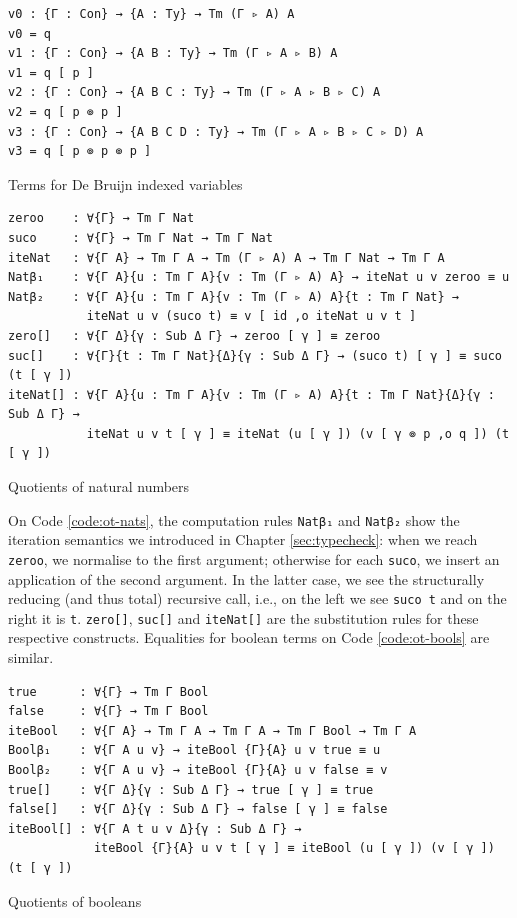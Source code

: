 \begin{listing}[H]
\begin{verbatim}
v0 : {Γ : Con} → {A : Ty} → Tm (Γ ▹ A) A
v0 = q
v1 : {Γ : Con} → {A B : Ty} → Tm (Γ ▹ A ▹ B) A
v1 = q [ p ]
v2 : {Γ : Con} → {A B C : Ty} → Tm (Γ ▹ A ▹ B ▹ C) A
v2 = q [ p ⊚ p ]
v3 : {Γ : Con} → {A B C D : Ty} → Tm (Γ ▹ A ▹ B ▹ C ▹ D) A
v3 = q [ p ⊚ p ⊚ p ]
\end{verbatim}
\caption{Terms for De Bruijn indexed variables}
\label{code:ot-vars}
\end{listing}

\begin{listing}[H]
\begin{verbatim}
zeroo    : ∀{Γ} → Tm Γ Nat
suco     : ∀{Γ} → Tm Γ Nat → Tm Γ Nat
iteNat   : ∀{Γ A} → Tm Γ A → Tm (Γ ▹ A) A → Tm Γ Nat → Tm Γ A
Natβ₁    : ∀{Γ A}{u : Tm Γ A}{v : Tm (Γ ▹ A) A} → iteNat u v zeroo ≡ u
Natβ₂    : ∀{Γ A}{u : Tm Γ A}{v : Tm (Γ ▹ A) A}{t : Tm Γ Nat} →
           iteNat u v (suco t) ≡ v [ id ,o iteNat u v t ]
zero[]   : ∀{Γ Δ}{γ : Sub Δ Γ} → zeroo [ γ ] ≡ zeroo
suc[]    : ∀{Γ}{t : Tm Γ Nat}{Δ}{γ : Sub Δ Γ} → (suco t) [ γ ] ≡ suco (t [ γ ])
iteNat[] : ∀{Γ A}{u : Tm Γ A}{v : Tm (Γ ▹ A) A}{t : Tm Γ Nat}{Δ}{γ : Sub Δ Γ} →
           iteNat u v t [ γ ] ≡ iteNat (u [ γ ]) (v [ γ ⊚ p ,o q ]) (t [ γ ])
\end{verbatim}
\caption{Quotients of natural numbers}
\label{code:ot-nats}
\end{listing}

On Code \ref{code:ot-nats}, the computation rules \verb$Natβ₁$ and \verb$Natβ₂$ show the iteration semantics we introduced in Chapter \ref{sec:typecheck}: when we reach \verb$zeroo$, we normalise to the first argument; otherwise for each \verb$suco$, we insert an application of the second argument. In the latter case, we see the structurally reducing (and thus total) recursive call, i.e., on the left we see \verb$suco t$ and on the right it is \verb$t$. \verb$zero[]$, \verb$suc[]$ and \verb$iteNat[]$ are the substitution rules for these respective constructs. Equalities for boolean terms on Code \ref{code:ot-bools} are similar.

\begin{listing}[H]
\begin{verbatim}
true      : ∀{Γ} → Tm Γ Bool
false     : ∀{Γ} → Tm Γ Bool
iteBool   : ∀{Γ A} → Tm Γ A → Tm Γ A → Tm Γ Bool → Tm Γ A
Boolβ₁    : ∀{Γ A u v} → iteBool {Γ}{A} u v true ≡ u
Boolβ₂    : ∀{Γ A u v} → iteBool {Γ}{A} u v false ≡ v
true[]    : ∀{Γ Δ}{γ : Sub Δ Γ} → true [ γ ] ≡ true
false[]   : ∀{Γ Δ}{γ : Sub Δ Γ} → false [ γ ] ≡ false
iteBool[] : ∀{Γ A t u v Δ}{γ : Sub Δ Γ} →
            iteBool {Γ}{A} u v t [ γ ] ≡ iteBool (u [ γ ]) (v [ γ ]) (t [ γ ])
\end{verbatim}
\caption{Quotients of booleans}
\label{code:ot-bools}
\end{listing}

